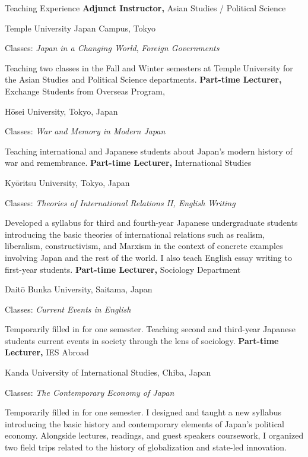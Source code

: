 \begin{rubric}{Teaching Experience}
 \entry*[2025/09 -- 2026/04\hfill]%
 \textbf{Adjunct Instructor,} Asian Studies / Political Science
 \par Temple University Japan Campus, Tokyo
\par Classes: \emph{Japan in a Changing World}, \emph{Foreign Governments}
      \par Teaching two classes in the Fall and Winter semesters at Temple University for the Asian Studies and Political Science departments.
%
%
%
 \textbf{Part-time Lecturer,} Exchange Students from Overseas Program,
 \par Hōsei University, Tokyo, Japan
        \par Classes: \emph{War and Memory in Modern Japan}
        \par Teaching international and Japanese students about Japan's modern history of war and remembrance.
 \entry*[2024/09 -- 2026/03\hfill]%
 \textbf{Part-time Lecturer,} International Studies
 \par Kyōritsu University, Tokyo, Japan
        \par Classes: \emph{Theories of International Relations II, English Writing}
        \par Developed a syllabus for third and fourth-year Japanese undergraduate students introducing the basic theories of international relations such as realism, liberalism, constructivism, and Marxism in the context of concrete examples involving Japan and the rest of the world. I also teach English essay writing to first-year students.
  \entry*[2024/09 -- 2025/03\hfill]%
  \textbf{Part-time Lecturer,} Sociology Department
  \par Daitō Bunka University, Saitama, Japan
        \par Classes: \emph{Current Events in English}
        \par Temporarily filled in for one semester. Teaching second and third-year Japanese students current events in society through the lens of sociology.
 \entry*[2024/09 -- 2024/12\hfill]%
 \textbf{Part-time Lecturer,} IES Abroad
 \par Kanda University of International Studies, Chiba, Japan
        \par Classes: \emph{The Contemporary Economy of Japan}
        \par Temporarily filled in for one semester. I designed and taught a new syllabus introducing the basic history and contemporary elements of Japan's political economy. Alongside lectures, readings, and guest speakers coursework, I organized two field trips related to the history of globalization and state-led innovation.

\end{rubric}
